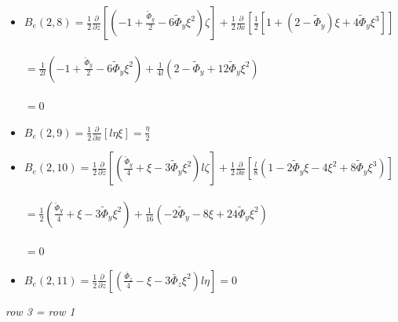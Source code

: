 \documentclass[a4paper,11pt]{article}
\newcommand{\gr}{\textbf}
\begin{document}
\begin{itemize}[label=$\gr{-}$, font=\LARGE, font=\color{color1}, topsep = 0.2cm, itemsep=0.2cm]
	\item $B_e(2,8) = \frac{1}{2} \frac{\partial}{\partial z} \left[ \left( -1 + \frac{\tilde{\Phi}_y}{2} - 6 \tilde{\Phi}_y \xi^2 \right) \zeta \right] + \frac{1}{2} \frac{\partial}{\partial x} \left[ \frac{1}{2} \left[ 1 + (2 - \tilde{\Phi}_y) \xi + 4\tilde{\Phi}_y \xi^3 \right] \right] $
	    \\ \\ \text{\hspace{13mm}} $ = \frac{1}{2l} \left( -1 + \frac{\tilde{\Phi}_y}{2} - 6 \tilde{\Phi}_y \xi^2 \right) + \frac{1}{4l} \left( 2 - \tilde{\Phi}_y + 12 \tilde{\Phi}_y \xi^2 \right)$
	    \\ \\ \text{\hspace{13mm}} $ = 0 $
	\item $B_e(2,9) = \frac{1}{2} \frac{\partial}{\partial x} \left[ l \eta \xi \right] = \frac{\eta}{2} $
	\item $B_e(2,10) = \frac{1}{2} \frac{\partial}{\partial z} \left[ \left( \frac{\tilde{\Phi}_y}{4} +\xi - 3 \tilde{\Phi}_y \xi^2 \right) l \zeta \right] + \frac{1}{2} \frac{\partial}{\partial x} \left[ \frac{l}{8} \left( 1 - 2\tilde{\Phi}_y \xi - 4 \xi^2 + 8\tilde{\Phi}_y \xi^3 \right) \right] $
	    \\ \\ \text{\hspace{13mm}} $ = \frac{1}{2} \left( \frac{\tilde{\Phi}_y}{4} +\xi - 3 \tilde{\Phi}_y \xi^2 \right) + \frac{1}{16} \left( - 2 \tilde{\Phi}_y - 8 \xi + 24 \tilde{\Phi}_y \xi^2 \right)$
	     \\ \\ \text{\hspace{13mm}} $ = 0 $
	\item $B_e(2,11) = \frac{1}{2} \frac{\partial}{\partial z} \left[ \left( \frac{\bar{\Phi}_z}{4} - \xi - 3 \bar{\Phi}_z \xi^2 \right) l \eta \right] = 0$
\end{itemize}

\noindent \textit{row 3 = row 1}
\end{document}
